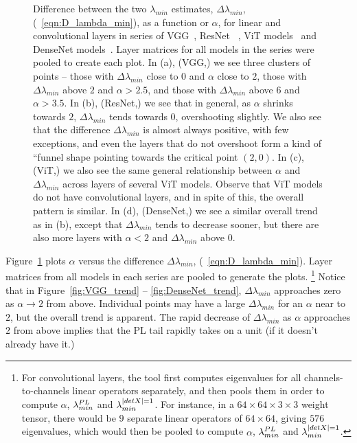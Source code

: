 \begin{figure}[t]
{      \label{fig:DenseNet_trend}
    }
    \caption{Difference between the two $\lambda_{min}$ estimates, $\Delta\lambda_{min}$, (\EQN~\ref{eqn:D_lambda_min}), as a 
        function or $\alpha$, for linear and convolutional layers in series of VGG~\cite{VGG14_TR}, ResNet~ 
        \cite{ResNet15_TR}, ViT models~\cite{VIT20_TR} and DenseNet models~\cite{DenseNet17_TR}. Layer matrices for all 
        models in the series were pooled to create each plot. In (a), (VGG,) we see three clusters of points -- those 
        with $\Delta \lambda_{min}$ close to $0$ and $\alpha$ close to $2$, those with $\Delta \lambda_{min}$ above $2$ 
        and $\alpha > 2.5$, and those with $\Delta \lambda_{min}$ above $6$ and $\alpha > 3.5$. In (b), (ResNet,) we see 
        that in general, as $\alpha$ shrinks towards $2$, $\Delta \lambda_{min}$ tends towards $0$, overshooting 
        slightly. We also see that the difference $\Delta\lambda_{min}$ is almost always positive, with few exceptions, 
        and even the layers that do not overshoot form a kind of ``funnel shape pointing towards the critical point 
        $(2, 0)$. In (c), (ViT,) we also see the same general relationship between $\alpha$ and $\Delta \lambda_{min}$ 
        across layers of several ViT models. Observe that ViT models do not have convolutional layers, and in spite of 
        this, the overall pattern is similar. In (d), (DenseNet,) we see a similar overall trend as in (b), except that 
        $\Delta\lambda_{min}$ tends to decrease sooner, but there are also more layers with $\alpha < 2$ and 
        $\Delta\lambda_{min}$ above $0$.
    }
  \label{fig:CV_ESD_trends}
\end{figure}


Figure~\ref{fig:CV_ESD_trends} plots $\alpha$ versus the difference $\Delta\lambda_{min}$, (\EQN~\ref{eqn:D_lambda_min}).
Layer matrices from all models in each series are pooled to generate the plots.%
\footnote{For convolutional layers, the \WW tool first computes eigenvalues for all channels-to-channels linear operators separately, and then pools them in order to compute $\alpha$, $\lambda^{PL}_{min}$ and $\lambda^{\vert detX\vert=1}_{min}$. For instance, in a $64\times 64\times 3\times 3$ weight tensor, there would be $9$ separate linear operators of $64\times 64$, giving $576$ eigenvalues, which would then be pooled to compute $\alpha$, $\lambda^{PL}_{min}$ and $\lambda^{\vert detX\vert=1}_{min}$.} 
Notice that in Figure~\ref{fig:VGG_trend} -- \ref{fig:DenseNet_trend}, $\Delta\lambda_{min}$ approaches zero as $\alpha\rightarrow 2$ from above. 
Individual points may have a large $\Delta\lambda_{min}$ for an $\alpha$ near to $2$, but the overall trend is apparent. 
The rapid decrease of $\Delta\lambda_{min}$ as $\alpha$ approaches $2$ from above implies that the PL tail rapidly 
takes on a unit \TRACELOG  (if it doesn't already have it.)

